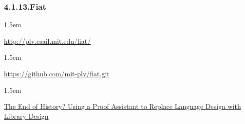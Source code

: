 \documentclass[12pt,twoside]{article}
\begin{document}
\subsubsection{4.1.13.\hspace*{0.5em}Fiat}\label{sec-fiat}%

\begin{mddefinitions}%


\begin{mdbmarginx}{}{}{}{1.5em}%
\begin{mddefdata}%
\href{http://plv.csail.mit.edu/fiat/}{{\ttfamily http://\hspace{0pt}plv.\hspace{0pt}csail.\hspace{0pt}mit.\hspace{0pt}edu/\hspace{0pt}fiat/\hspace{0pt}}}
\end{mddefdata}%
\end{mdbmarginx}%


\begin{mdbmarginx}{}{}{}{1.5em}%
\begin{mddefdata}%
\href{https://github.com/mit-plv/fiat.git}{{\ttfamily https://\hspace{0pt}github.\hspace{0pt}com/\hspace{0pt}mit-\hspace{0pt}plv/\hspace{0pt}fiat.\hspace{0pt}git}}
\end{mddefdata}%
\end{mdbmarginx}%


\begin{mdbmarginx}{}{}{}{1.5em}%
\begin{mddefdata}%
\href{https://www.cs.purdue.edu/homes/bendy/Fiat/fiat-snapl.pdf}{The End of History? Using a Proof Assistant to
Replace Language Design with Library Design}%
\end{mddefdata}%
\end{mdbmarginx}%
\end{mddefinitions}%
\end{document}
